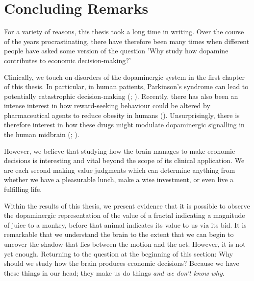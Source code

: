 \clearpage
\section{Concluding Remarks}

For a variety of reasons, this thesis took a long time in writing. Over the course of the years procrastinating, there have therefore been many times when different people have asked some version of the question 'Why study how dopamine contributes to economic decision-making?'

Clinically, we touch on disorders of the dopaminergic system in the first chapter of this thesis. In particular, in human patients, Parkinson's syndrome can lead to potentially catastrophic decision-making (\cite{gilmourImpairedValuebasedDecisionmaking2024}; \cite{denbrokApathyParkinsonsDisease2015}). Recently, there has also been an intense interest in how reward-seeking behaviour could be altered by pharmaceutical agents to reduce obesity in humans (\cite{wangGLP1ReceptorAgonists2023}). Unsurprisingly, there is therefore interest in how these drugs might modulate dopaminergic signalling in the human midbrain (\cite{zhuHedonicEatingControlled2025}; \cite{krupaCurbingAppetitesRestoring2025}).

However, we believe that studying how the brain manages to make economic decisions is interesting and vital beyond the scope of its clinical application. We are each second making value judgments which can determine anything from whether we have a pleasurable lunch, make a wise investment, or even live a fulfilling life.

Within the results of this thesis, we present evidence that it is possible to observe the dopaminergic representation of the value of a fractal indicating a magnitude of juice to a monkey, before that animal indicates its value to us via its bid. It is remarkable that we understand the brain to the extent that we can begin to uncover the shadow that lies between the motion and the act. However, it is not yet enough. Returning to the question at the beginning of this section: Why should we study how the brain produces economic decisions? Because we have these things in our head; they make us do things \textit{and we don't know why}. 